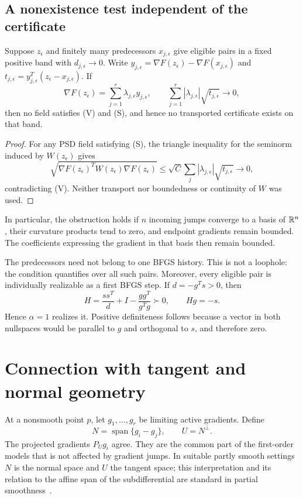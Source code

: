 \subsection{A nonexistence test independent of the certificate}
\begin{proposition}\label{G:prop:star}
Suppose $z_\epsilon$ and finitely many predecessors $x_{j,\epsilon}$ give eligible pairs in a fixed positive band with $d_{j,\epsilon}\to0$. Write $y_{j,\epsilon}=\nabla F(z_\epsilon)-\nabla F(x_{j,\epsilon})$ and $t_{j,\epsilon}=y_{j,\epsilon}^T(z_\epsilon-x_{j,\epsilon})$. If
\[
 \nabla F(z_\epsilon)=\sum_{j=1}^r\lambda_{j,\epsilon}y_{j,\epsilon},
 \qquad
 \sum_{j=1}^r|\lambda_{j,\epsilon}|\sqrt{t_{j,\epsilon}}\longrightarrow0,
\]
then no field satisfies (V) and (S), and hence no transported certificate exists on that band.
\end{proposition}
\begin{proof}
For any PSD field satisfying (S), the triangle inequality for the seminorm induced by $W(z_\epsilon)$ gives
\[
 \sqrt{\nabla F(z_\epsilon)^TW(z_\epsilon)\nabla F(z_\epsilon)}
 \le\sqrt C\sum_j|\lambda_{j,\epsilon}|\sqrt{t_{j,\epsilon}}\to0,
\]
contradicting (V). Neither transport nor boundedness or continuity of $W$ was used.
\end{proof}
In particular, the obstruction holds if $n$ incoming jumps converge to a basis of $\mathbb R^n$, their curvature products tend to zero, and endpoint gradients remain bounded. The coefficients expressing the gradient in that basis then remain bounded.

The predecessors need not belong to one BFGS history. This is not a loophole: the condition quantifies over all such pairs. Moreover, every eligible pair is individually realizable as a first BFGS step. If $d=-g^Ts>0$, then
\[
 H=\frac{ss^T}{d}+I-\frac{gg^T}{g^Tg}\succ0,\qquad Hg=-s.
\]
Hence $\alpha=1$ realizes it. Positive definiteness follows because a vector in both nullspaces would be parallel to $g$ and orthogonal to $s$, and therefore zero.


\setcounter{section}{3}
\setcounter{theorem}{0}
\setcounter{equation}{4}
\section{Connection with tangent and normal geometry}
At a nonsmooth point $p$, let $g_1,\dots,g_r$ be limiting active gradients. Define
\[
 N=\operatorname{span}\{g_i-g_j\},\qquad U=N^\perp.
\]
The projected gradients $P_Ug_i$ agree. They are the common part of the first-order models that is not affected by gradient jumps. In suitable partly smooth settings $N$ is the normal space and $U$ the tangent space; this interpretation and its relation to the affine span of the subdifferential are standard in partial smoothness~\cite{LL}.

